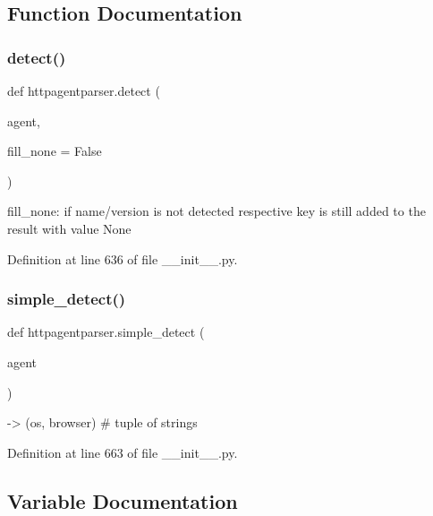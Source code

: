 \subsection{Function Documentation}
\hypertarget{namespacehttpagentparser_a025e116e0d3b48ee4b503c22a5c0b526}{}\label{namespacehttpagentparser_a025e116e0d3b48ee4b503c22a5c0b526} 
\subsubsection{\texorpdfstring{detect()}{detect()}}
{\footnotesize\ttfamily def httpagentparser.\+detect (\begin{DoxyParamCaption}\item[{}]{agent,  }\item[{}]{fill\+\_\+none = {\ttfamily False} }\end{DoxyParamCaption})}

\begin{DoxyVerb}fill_none: if name/version is not detected respective key is still added to the result with value None
\end{DoxyVerb}
 

Definition at line 636 of file \+\_\+\+\_\+init\+\_\+\+\_\+.\+py.

\hypertarget{namespacehttpagentparser_a0a15d8216f7c48a16305652ede895ee8}{}\label{namespacehttpagentparser_a0a15d8216f7c48a16305652ede895ee8} 
\subsubsection{\texorpdfstring{simple\+\_\+detect()}{simple\_detect()}}
{\footnotesize\ttfamily def httpagentparser.\+simple\+\_\+detect (\begin{DoxyParamCaption}\item[{}]{agent }\end{DoxyParamCaption})}

\begin{DoxyVerb}-> (os, browser) # tuple of strings
\end{DoxyVerb}
 

Definition at line 663 of file \+\_\+\+\_\+init\+\_\+\+\_\+.\+py.



\subsection{Variable Documentation}
\hypertarget{namespacehttpagentparser_ad1f9ce48b19aa304d6918cea335a7723}{}\label{namespacehttpagentparser_ad1f9ce48b19aa304d6918cea335a7723} 
